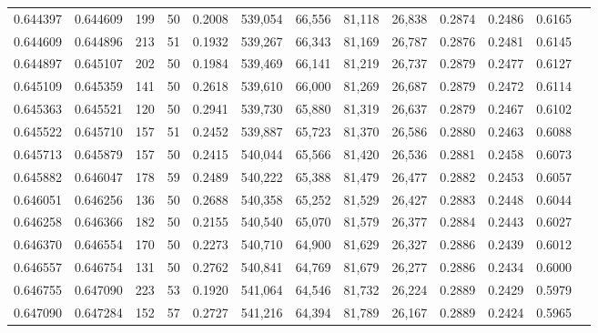 \begin{tabular}{rrrrrrrrrrrrr}
0.644397 & 0.644609 &   199 &  50 &                                     0.2008 & 539,054 &  66,556 &  81,118 &  26,838 & 0.2874 & 0.2486 & 0.6165 \\
0.644609 & 0.644896 &   213 &  51 &                                     0.1932 & 539,267 &  66,343 &  81,169 &  26,787 & 0.2876 & 0.2481 & 0.6145 \\
0.644897 & 0.645107 &   202 &  50 &                                     0.1984 & 539,469 &  66,141 &  81,219 &  26,737 & 0.2879 & 0.2477 & 0.6127 \\
0.645109 & 0.645359 &   141 &  50 &                                     0.2618 & 539,610 &  66,000 &  81,269 &  26,687 & 0.2879 & 0.2472 & 0.6114 \\
0.645363 & 0.645521 &   120 &  50 &                                     0.2941 & 539,730 &  65,880 &  81,319 &  26,637 & 0.2879 & 0.2467 & 0.6102 \\
0.645522 & 0.645710 &   157 &  51 &                                     0.2452 & 539,887 &  65,723 &  81,370 &  26,586 & 0.2880 & 0.2463 & 0.6088 \\
0.645713 & 0.645879 &   157 &  50 &                                     0.2415 & 540,044 &  65,566 &  81,420 &  26,536 & 0.2881 & 0.2458 & 0.6073 \\
0.645882 & 0.646047 &   178 &  59 &                                     0.2489 & 540,222 &  65,388 &  81,479 &  26,477 & 0.2882 & 0.2453 & 0.6057 \\
0.646051 & 0.646256 &   136 &  50 &                                     0.2688 & 540,358 &  65,252 &  81,529 &  26,427 & 0.2883 & 0.2448 & 0.6044 \\
0.646258 & 0.646366 &   182 &  50 &                                     0.2155 & 540,540 &  65,070 &  81,579 &  26,377 & 0.2884 & 0.2443 & 0.6027 \\
0.646370 & 0.646554 &   170 &  50 &                                     0.2273 & 540,710 &  64,900 &  81,629 &  26,327 & 0.2886 & 0.2439 & 0.6012 \\
0.646557 & 0.646754 &   131 &  50 &                                     0.2762 & 540,841 &  64,769 &  81,679 &  26,277 & 0.2886 & 0.2434 & 0.6000 \\
0.646755 & 0.647090 &   223 &  53 &                                     0.1920 & 541,064 &  64,546 &  81,732 &  26,224 & 0.2889 & 0.2429 & 0.5979 \\
0.647090 & 0.647284 &   152 &  57 &                                     0.2727 & 541,216 &  64,394 &  81,789 &  26,167 & 0.2889 & 0.2424 & 0.5965 \\

\end{tabular}

